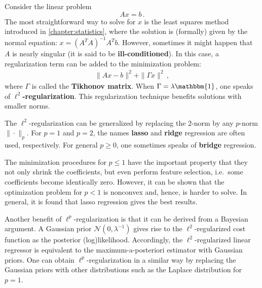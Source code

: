     \begin{method}{
        Consider the linear problem \[Ax = b\,.\] The most straightforward way to solve for $x$ is the least squares method introduced in \cref{chapter:statistics}, where the solution is (formally) given by the normal equation: $x=(A^TA)^{-1}A^Tb$. However, sometimes it might happen that $A$ is nearly singular (it is said to be \textbf{ill-conditioned}). In this case, a regularization term can be added to the minimization problem:
        \begin{gather}
            \|Ax-b\|^2+\|\Gamma x\|^2\,,
        \end{gather}
        where $\Gamma$ is called the \textbf{Tikhonov matrix}. When $\Gamma=\lambda\mathbbm{1}$, one speaks of \textbf{$\ell^2$-regularization}. This regularization technique benefits solutions with smaller norms.
    }
    \end{method}
    \begin{remark}
        The $\ell^2$-regularization can be generalized by replacing the 2-norm by any $p$-norm $\|\cdot\|_p$. For $p=1$ and $p=2$, the names \textbf{lasso} and \textbf{ridge} regression are often used, respectively. For general $p\geq0$, one sometimes speaks of \textbf{bridge} regression.

        The minimization procedures for $p\leq1$ have the important property that they not only shrink the coefficients, but even perform feature selection, i.e.~some coefficients become identically zero. However, it can be shown that the optimization problem for $p<1$ is nonconvex and, hence, is harder to solve. In general, it is found that lasso regression gives the best results.

        Another benefit of $\ell^p$-regularization is that it can be derived from a Bayesian argument. A Gaussian prior $\mathcal{N}(0,\lambda^{-1})$ gives rise to the $\ell^2$-regularized cost function as the posterior (log)likelihood. Accordingly, the $\ell^2$-regularized linear regressor is equivalent to the maximum-a-posteriori estimator with Gaussian priors. One can obtain $\ell^p$-regularization in a similar way by replacing the Gaussian priors with other distributions such as the Laplace distribution for $p=1$.
    \end{remark}

